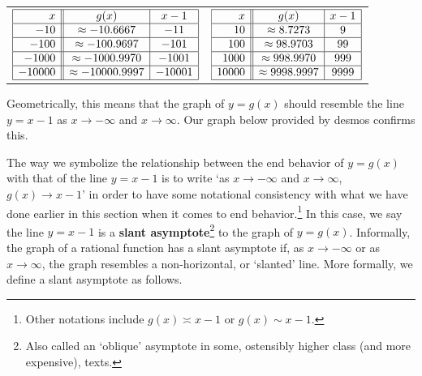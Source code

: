 \documentclass{ximera}
\begin{document}
\begin{center}
\begin{tabular}{cc}

$\begin{array}{|r||c|c|}  \hline
 x & g(x) & x-1 \\ \hline
 -10 & \approx -10.6667 & -11 \\  \hline
 -100 & \approx -100.9697 & -101 \\  \hline 
 -1000 &  \approx -1000.9970&   -1001 \\ \hline 
  -10000 &  \approx -10000.9997 &  -10001 \\ \hline 
  \end{array} $ & 

$\begin{array}{|r||c|c|}  \hline
x & g(x) & x-1 \\ \hline
 10 & \approx 8.7273 &    9 \\\hline
 100 & \approx 98.9703 &   99 \\ \hline 
 1000 &  \approx 998.9970 &  999 \\ \hline 
  10000 &  \approx 9998.9997 &   9999 \\ \hline 
  \end{array} $ \\
  
  \end{tabular}
  \end{center}
  

Geometrically, this means that the graph of $y=g(x)$ should resemble the line $y = x-1$ as $x \rightarrow  -\infty$ and $x \rightarrow \infty$.   Our graph below provided by desmos confirms this. 
 
\begin{center}
\end{center} 
 
The way we symbolize the relationship between the end behavior of $y=g(x)$ with that of the line $y=x-1$ is to write `as $x \rightarrow  -\infty$ and $x \rightarrow \infty$, $g(x) \rightarrow x-1$' in order to have some notational consistency with what we have done earlier in this section when it comes to end behavior.\footnote{Other notations include $g(x) \asymp x-1$ or $g(x) \sim x-1$.}  In this case, we say the line $y=x-1$ is a    \textbf{slant asymptote}\footnote{Also called an `oblique' asymptote in some, ostensibly higher class (and more expensive), texts.}  to the graph of $y=g(x)$.  Informally, the graph of a rational function has a slant asymptote if, as $x \rightarrow -\infty$ or as $x \rightarrow \infty$, the graph resembles a non-horizontal, or `slanted' line.  More formally, we define a slant asymptote as follows.
\end{document}
